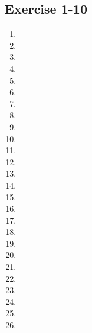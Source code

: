 
\subsection{Exercise 1-10} %

\begin{multicols}{2}
\begin{enumerate}[itemsep=5pt, label=\textbf{\arabic*}. ] 
\item %
\item %
\item %
\item %
\item %
\item %
\item %
\item %
\item %
\item %
\item %
\item %
\item %
\item %
\item %
\item %
\item %
\item %
\item %
\item %
\item %
\item %
\item %
\item %
\item %
\item %
\end{enumerate}
\end{multicols}

